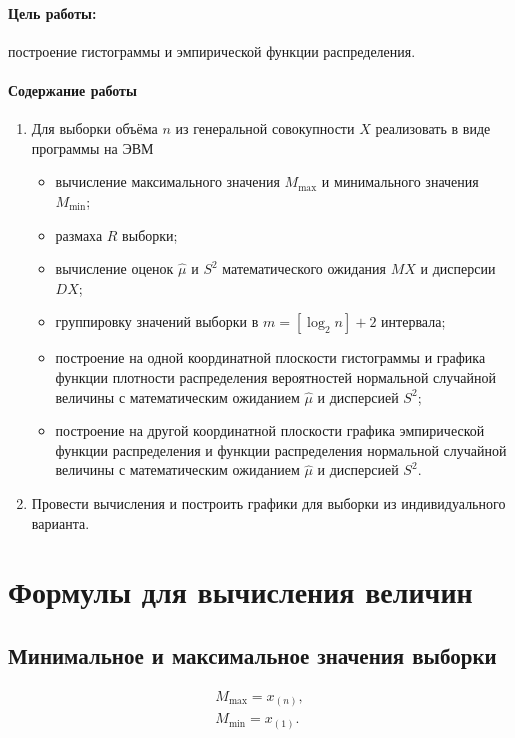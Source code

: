 \documentclass[a4paper,oneside,12pt]{extreport}
\begin{document}


\paragraph{Цель работы:} построение гистограммы и эмпирической функции распределения.

\paragraph{Содержание работы}

\begin{enumerate}
	\item Для выборки объёма $n$ из генеральной совокупности $X$ реализовать в виде программы на ЭВМ
	\begin{itemize}
		\item вычисление максимального значения $M_{\max}$ и минимального значения $M_{\min}$;
		\item размаха $R$ выборки;
		\item вычисление оценок $\hat\mu$ и $S^2$ математического ожидания $MX$ и дисперсии $DX$;
		\item группировку значений выборки в $m = [\log_2 n] + 2$ интервала;
		\item построение на одной координатной плоскости гистограммы и графика функции плотности распределения вероятностей нормальной случайной величины с математическим ожиданием $\hat{\mu}$ и дисперсией $S^2$;
		\item построение на другой координатной плоскости графика эмпирической функции распределения и функции распределения нормальной случайной величины с математическим ожиданием $\hat{\mu}$ и дисперсией $S^2$.
	\end{itemize}
	\item Провести вычисления и построить графики для выборки из индивидуального варианта.
\end{enumerate}

\pagebreak
\section{Формулы для вычисления величин}

\subsection{Минимальное и максимальное значения выборки}
\begin{gather}
	M_{\max} = x_{(n)},\\
	M_{\min} = x_{(1)}.
\end{gather}
\end{document}

